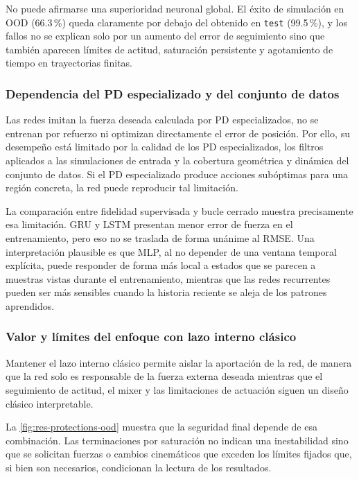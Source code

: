 No puede afirmarse una superioridad neuronal global. El éxito de simulación en OOD
(66.3\,\%) queda claramente por debajo del obtenido en \texttt{test}
(99.5\,\%), y los fallos no se explican solo por un aumento del error de
seguimiento sino que también aparecen límites de actitud, saturación persistente y
agotamiento de tiempo en trayectorias finitas.

\subsubsection*{Dependencia del PD especializado y del conjunto de datos}

Las redes imitan la fuerza deseada calculada por PD especializados, no se entrenan por
refuerzo ni optimizan directamente el error de posición. Por ello, su desempeño
está limitado por la calidad de los PD especializados, los filtros aplicados
a las simulaciones de entrada y la cobertura geométrica y dinámica del conjunto de datos.
Si el PD especializado produce acciones subóptimas para una región concreta, la red puede
reproducir tal limitación.

La comparación entre fidelidad supervisada y bucle cerrado muestra precisamente
esa limitación. GRU y LSTM presentan menor error de fuerza en el entrenamiento,
pero eso no se traslada de forma unánime al RMSE. Una interpretación plausible es que
MLP, al no depender de una ventana temporal explícita, puede responder de forma
más local a estados que se parecen a muestras vistas durante el entrenamiento,
mientras que las redes recurrentes pueden ser más sensibles cuando la historia
reciente se aleja de los patrones aprendidos.

\subsubsection*{Valor y límites del enfoque con lazo interno clásico}

Mantener el lazo interno clásico permite aislar la aportación de la red, de manera
que la red solo es responsable de la fuerza externa deseada mientras que el seguimiento de
actitud, el mixer y las limitaciones de actuación siguen un diseño clásico
interpretable.

La \autoref{fig:res-protections-ood} muestra que la seguridad final depende de
esa combinación. Las terminaciones por saturación no indican una inestabilidad sino
que se solicitan fuerzas o cambios cinemáticos que exceden los límites fijados que, si
bien son necesarios, condicionan la lectura de los resultados.

